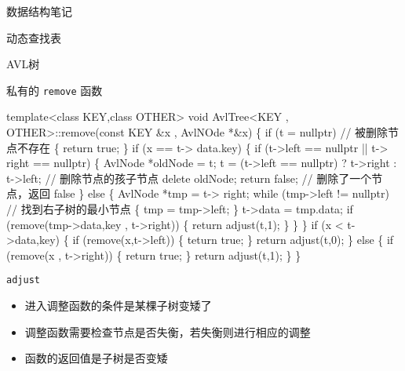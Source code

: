\documentclass[
  ignorenonframetext,
]{beamer}
\newenvironment{Shaded}{}{}
\newcommand{\NormalTok}[1]{#1}
\providecommand{\tightlist}{%
  \setlength{\itemsep}{0pt}\setlength{\parskip}{0pt}}
\begin{document}
\begin{frame}[fragile]{数据结构笔记}
\begin{block}{动态查找表}
\begin{block}{AVL树}
\begin{block}{私有的 \texttt{remove} 函数}
\protect{}\label{ux79c1ux6709ux7684-remove-ux51fdux6570}
\begin{Shaded}
\begin{Highlighting}[]
\NormalTok{template\textless{}class KEY,class OTHER\textgreater{}}
\NormalTok{void AvlTree\textless{}KEY , OTHER\textgreater{}::remove(const KEY \&x , AvlNOde *\&x)}
\NormalTok{\{}
\NormalTok{  if (t = nullptr) // 被删除节点不存在}
\NormalTok{  \{}
\NormalTok{    return true;}
\NormalTok{  \}}
\NormalTok{  if (x == t{-}\textgreater{} data.key)}
\NormalTok{  \{}
\NormalTok{    if (t{-}\textgreater{}left == nullptr || t{-}\textgreater{} right == nullptr)}
\NormalTok{    \{}
\NormalTok{      AvlNode *oldNode = t;}
\NormalTok{      t = (t{-}\textgreater{}left == nullptr) ? t{-}\textgreater{}right : t{-}\textgreater{}left; // 删除节点的孩子节点}
\NormalTok{      delete oldNode;}
\NormalTok{      return false; // 删除了一个节点，返回 \textasciigrave{}false\textasciigrave{}}
\NormalTok{    \}}
\NormalTok{    else}
\NormalTok{    \{}
\NormalTok{      AvlNode *tmp = t{-}\textgreater{} right;}
\NormalTok{      while (tmp{-}\textgreater{}left != nullptr) // 找到右子树的最小节点}
\NormalTok{      \{}
\NormalTok{        tmp = tmp{-}\textgreater{}left;}
\NormalTok{      \}}
\NormalTok{      t{-}\textgreater{}data = tmp.data;}
\NormalTok{      if (remove(tmp{-}\textgreater{}data,key , t{-}\textgreater{}right))}
\NormalTok{      \{}
\NormalTok{        return adjust(t,1);}
\NormalTok{      \}}
\NormalTok{    \}}
\NormalTok{  \}}
\NormalTok{  if (x \textless{} t{-}\textgreater{}data,key)}
\NormalTok{  \{}
\NormalTok{    if (remove(x,t{-}\textgreater{}left))}
\NormalTok{    \{}
\NormalTok{      teturn true;}
\NormalTok{    \}}
\NormalTok{    return adjust(t,0);}
\NormalTok{  \}}
\NormalTok{  else}
\NormalTok{  \{}
\NormalTok{    if (remove(x , t{-}\textgreater{}right))}
\NormalTok{    \{}
\NormalTok{      return true;}
\NormalTok{    \}}
\NormalTok{    return adjust(t,1);}
\NormalTok{  \}}
\NormalTok{\}}
\end{Highlighting}
\end{Shaded}
\end{block}

\begin{block}{\texttt{adjust}}
\protect{}\label{adjust}
\begin{itemize}
\tightlist
\item
  进入调整函数的条件是某棵子树变矮了
\item
  调整函数需要检查节点是否失衡，若失衡则进行相应的调整
\item
  函数的返回值是子树是否变矮


\end{itemize}
\end{block}
\end{block}
\end{block}
\end{frame}
\end{document}
